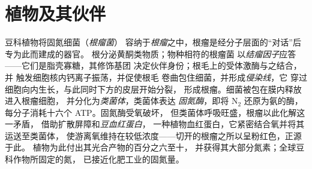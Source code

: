 \section{植物及其伙伴}

\begin{definition}[豆科植物与根瘤菌的共生]\label{def:b3:microbiomes:nodule}
豆科植物将固氮细菌（\emph{根瘤菌}）
容纳于\emph{根瘤}之中，根瘤是经分子层面的“对话”后专为此而建成的器官。
根分泌黄酮类物质；物种相符的根瘤菌
以\emph{结瘤因子}应答——它们是脂壳寡糖，其修饰基团
决定伙伴身份；根毛上的受体激酶与之结合，并
触发细胞核内钙离子振荡，并促使根毛
卷曲包住细菌，并形成\emph{侵染线}，它
穿过细胞向内生长，与此同时下方的皮层开始分裂，
形成根瘤。细菌被包在膜内释放进入根瘤细胞，
并分化为\emph{类菌体}，类菌体表达
\emph{固氮酶}，即将 N$_{2}$ 还原为氨的酶，
每分子消耗十六个 ATP。固氮酶受氧破坏，
但类菌体呼吸旺盛，根瘤以此化解这一矛盾，
借助扩散屏障和\emph{豆血红蛋白}，
一种植物血红蛋白，它紧密结合氧并将其运送至类菌体，
使游离氧维持在较低浓度——切开的根瘤之所以呈粉红色，正源于此。
植物为此付出其光合产物的百分之六至十，
并获得其大部分氮素；全球豆科作物所固定的氮，
已接近化肥工业的固氮量。
\end{definition}

